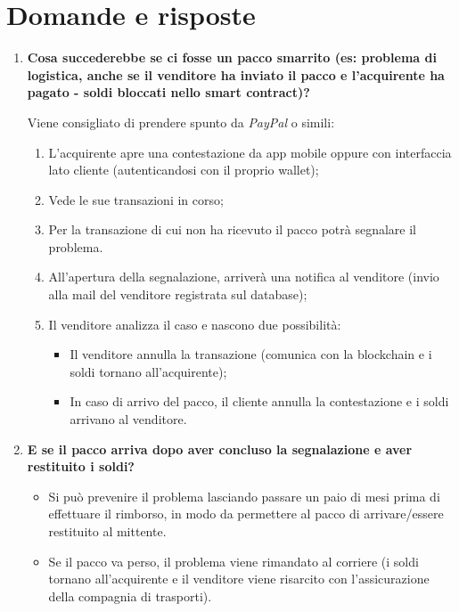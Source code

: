 \documentclass[11pt]{article}
\begin{document}
		\newpage
		
		\section{Domande e risposte}
			\begin{enumerate}
				\item \textbf{Cosa succederebbe se ci fosse un pacco smarrito (es: problema di logistica, anche se il venditore
				ha inviato il pacco e l'acquirente ha pagato - soldi bloccati nello smart contract)?}
				
				\medskip		
						
				Viene consigliato di prendere spunto da \textit{PayPal} o simili: 
				\begin{enumerate}
					\item L'acquirente apre una contestazione da app mobile oppure con interfaccia lato cliente
					(autenticandosi con il proprio wallet);
					\item Vede le sue transazioni in corso;
					\item Per la transazione di cui non ha ricevuto il pacco potrà segnalare il problema.
					\item All'apertura della segnalazione, arriverà una notifica al venditore (invio alla mail del venditore
					registrata sul database);
					\item Il venditore analizza il caso e nascono due possibilità: 
						\begin{itemize}
							\item Il venditore annulla la transazione (comunica con la blockchain e i soldi tornano all'acquirente); 
							\item In caso di arrivo del pacco, il cliente annulla la contestazione e i soldi arrivano
							al venditore.
						\end{itemize}
				\end{enumerate}
				
				\bigskip
				
				\item \textbf{E se il pacco arriva dopo aver concluso la segnalazione e aver restituito i soldi?}
				
				\medskip
				
				\begin{itemize}
					\item Si può prevenire il problema lasciando passare un paio di mesi prima di effettuare il rimborso,
					in modo da permettere al pacco di arrivare/essere restituito al mittente.
					\item Se il pacco va perso, il problema viene rimandato al corriere (i soldi tornano all'acquirente e il
					venditore viene risarcito con l'assicurazione della compagnia di trasporti).
				\end{itemize}
				

\end{enumerate}
\end{document}
